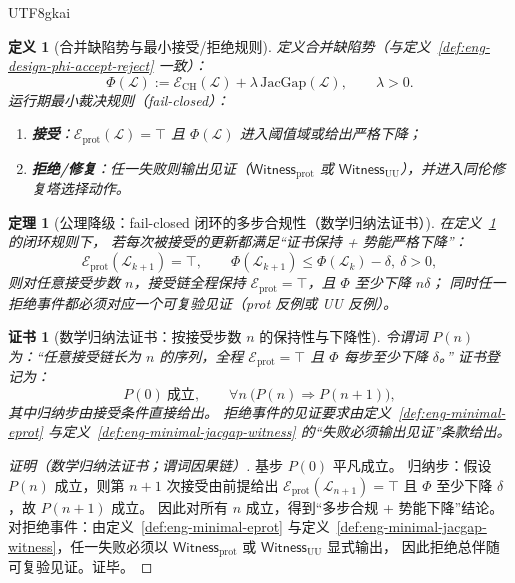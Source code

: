 \documentclass[12pt]{article}
\newtheorem{definition}{定义}[section]
\newtheorem{theorem}{定理}[section]
\newtheorem{Certificate}{证书}[section]
\newcommand{\JacGap}{\ensuremath{\mathrm{JacGap}}} %
\begin{document}
\begin{CJK*}{UTF8}{gkai}
\begin{definition}[合并缺陷势与最小接受/拒绝规则]
\label{def:eng-minimal-phi-loop}
定义合并缺陷势（与定义~\ref{def:eng-design-phi-accept-reject} 一致）：
\[
  \Phi(\mathcal{L})
  :=
  \mathcal{E}_{\mathrm{CH}}(\mathcal{L})+\lambda\,\JacGap(\mathcal{L}),
  \qquad \lambda>0.
\]
运行期最小裁决规则（fail-closed）：
\begin{enumerate}
  \item \textbf{接受}：$\mathcal{E}_{\mathrm{prot}}(\mathcal{L})=\top$ 且 $\Phi(\mathcal{L})$ 进入阈值域或给出严格下降；
  \item \textbf{拒绝/修复}：任一失败则输出见证（$\mathsf{Witness}_{\mathrm{prot}}$ 或 $\mathsf{Witness}_{\mathrm{UU}}$），并进入同伦修复塔选择动作。
\end{enumerate}
\end{definition}

\begin{theorem}[公理降级：fail-closed 闭环的多步合规性（数学归纳法证书）]
\label{thm:eng-minimal-loop-induction}
在定义~\ref{def:eng-minimal-phi-loop} 的闭环规则下，
若每次被接受的更新都满足“证书保持 + 势能严格下降”：
\[
  \mathcal{E}_{\mathrm{prot}}(\mathcal{L}_{k+1})=\top,\qquad
  \Phi(\mathcal{L}_{k+1})\le \Phi(\mathcal{L}_k)-\delta,\ \delta>0,
\]
则对任意接受步数 $n$，接受链全程保持 $\mathcal{E}_{\mathrm{prot}}=\top$，且 $\Phi$ 至少下降 $n\delta$；
同时任一拒绝事件都必须对应一个可复验见证（prot 反例或 UU 反例）。
\end{theorem}

\begin{Certificate}[数学归纳法证书：按接受步数 $n$ 的保持性与下降性]
\label{cert:eng-minimal-loop-induction}
令谓词 $P(n)$ 为：“任意接受链长为 $n$ 的序列，全程 $\mathcal{E}_{\mathrm{prot}}=\top$ 且 $\Phi$ 每步至少下降 $\delta$。”
证书登记为：
\[
  P(0)\ \text{成立},\qquad
  \forall n\ \bigl(P(n)\Rightarrow P(n+1)\bigr),
\]
其中归纳步由接受条件直接给出。
拒绝事件的见证要求由定义~\ref{def:eng-minimal-eprot} 与定义~\ref{def:eng-minimal-jacgap-witness} 的“失败必须输出见证”条款给出。
\end{Certificate}

\begin{proof}[证明（数学归纳法证书；谓词因果链）]
基步 $P(0)$ 平凡成立。
归纳步：假设 $P(n)$ 成立，则第 $n+1$ 次接受由前提给出 $\mathcal{E}_{\mathrm{prot}}(\mathcal{L}_{n+1})=\top$ 且 $\Phi$ 至少下降 $\delta$，故 $P(n+1)
  $ 成立。
因此对所有 $n$ 成立，得到“多步合规 + 势能下降”结论。
对拒绝事件：由定义~\ref{def:eng-minimal-eprot} 与定义~\ref{def:eng-minimal-jacgap-witness}，任一失败必须以 $\mathsf{Witness}_{\mathrm{prot}}
  $ 或 $\mathsf{Witness}_{\mathrm{UU}}$ 显式输出，
因此拒绝总伴随可复验见证。证毕。
\end{proof}


\end{CJK*}
\end{document}
